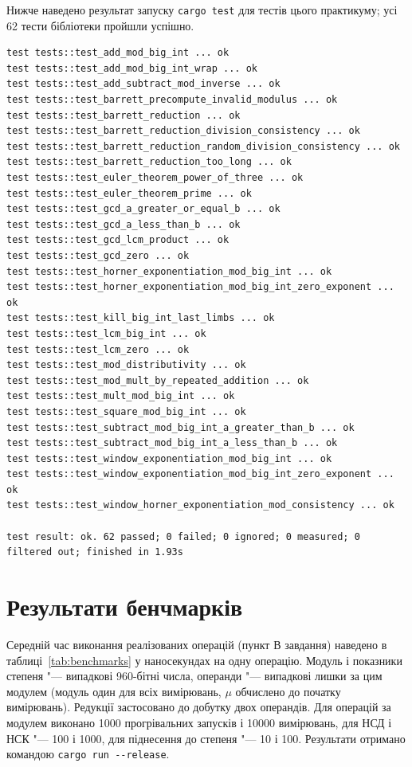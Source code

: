 \documentclass[11pt]{article}
\newcommand{\code}[1]{\texttt{#1}}
\begin{document}
Нижче наведено результат запуску \code{cargo test} для тестів цього практикуму;
усі 62 тести бібліотеки пройшли успішно.

\begin{lstlisting}[basicstyle=\ttfamily\scriptsize]
test tests::test_add_mod_big_int ... ok
test tests::test_add_mod_big_int_wrap ... ok
test tests::test_add_subtract_mod_inverse ... ok
test tests::test_barrett_precompute_invalid_modulus ... ok
test tests::test_barrett_reduction ... ok
test tests::test_barrett_reduction_division_consistency ... ok
test tests::test_barrett_reduction_random_division_consistency ... ok
test tests::test_barrett_reduction_too_long ... ok
test tests::test_euler_theorem_power_of_three ... ok
test tests::test_euler_theorem_prime ... ok
test tests::test_gcd_a_greater_or_equal_b ... ok
test tests::test_gcd_a_less_than_b ... ok
test tests::test_gcd_lcm_product ... ok
test tests::test_gcd_zero ... ok
test tests::test_horner_exponentiation_mod_big_int ... ok
test tests::test_horner_exponentiation_mod_big_int_zero_exponent ... ok
test tests::test_kill_big_int_last_limbs ... ok
test tests::test_lcm_big_int ... ok
test tests::test_lcm_zero ... ok
test tests::test_mod_distributivity ... ok
test tests::test_mod_mult_by_repeated_addition ... ok
test tests::test_mult_mod_big_int ... ok
test tests::test_square_mod_big_int ... ok
test tests::test_subtract_mod_big_int_a_greater_than_b ... ok
test tests::test_subtract_mod_big_int_a_less_than_b ... ok
test tests::test_window_exponentiation_mod_big_int ... ok
test tests::test_window_exponentiation_mod_big_int_zero_exponent ... ok
test tests::test_window_horner_exponentiation_mod_consistency ... ok

test result: ok. 62 passed; 0 failed; 0 ignored; 0 measured; 0 filtered out; finished in 1.93s
\end{lstlisting}

\section{Результати бенчмарків}

Середній час виконання реалізованих операцій (пункт В завдання) наведено
в таблиці~\ref{tab:benchmarks} у наносекундах на одну операцію.
Модуль і показники степеня "--- випадкові 960-бітні числа, операнди "--- випадкові
лишки за цим модулем (модуль один для всіх вимірювань, $\mu$ обчислено до початку
вимірювань).
Редукції застосовано до добутку двох операндів.
Для операцій за модулем виконано 1000 прогрівальних запусків і 10000 вимірювань,
для НСД і НСК "--- 100 і 1000, для піднесення до степеня "--- 10 і 100.
Результати отримано командою \code{cargo run -{}-release}.
\end{document}
